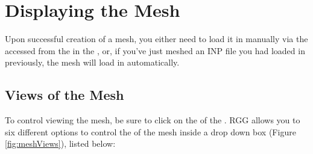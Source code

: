 \section{Displaying the Mesh}
\label{section:DisplayingMeshes}

Upon successful creation of a mesh, you either need to load it in manually via the  accessed from the  in the , or, if you've just meshed an INP file you had loaded in previously, the mesh will load in automatically.


\subsection{Views of the Mesh}
To control viewing the mesh, be sure to click on the  of the .  RGG allows you to six different options to control the  of the mesh inside a drop down box (Figure \ref{fig:meshViews}), listed below:


